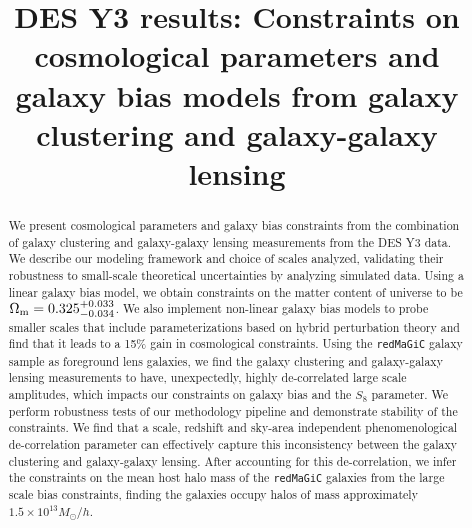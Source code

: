 \documentclass[aps, prd,twocolumn,superscriptaddress,nofootinbib,preprintnumbers]{revtex4-1}
\newcommand{\redmagic}{\texttt{redMaGiC} }
\begin{document}
\title[Short title, max. 45 characters]{DES Y3 results: Constraints on cosmological parameters and galaxy bias models from galaxy clustering and galaxy-galaxy lensing}


\label{firstpage}


\begin{abstract}
We present cosmological parameters and galaxy bias constraints from the combination of galaxy clustering and galaxy-galaxy lensing measurements from the DES Y3 data. We describe our modeling framework and choice of scales analyzed, validating their robustness to small-scale theoretical uncertainties by analyzing simulated data. Using a linear galaxy bias model, we obtain constraints on the matter content of universe to be $\Omega_{\rm m} = 0.325^{+0.033}_{-0.034}$. We also implement non-linear galaxy bias models to probe smaller scales that include parameterizations based on hybrid perturbation theory and find that it leads to a 15\% gain in cosmological constraints. Using the \redmagic galaxy sample as foreground lens galaxies, we find the galaxy clustering and galaxy-galaxy lensing measurements to have, unexpectedly, highly de-correlated large scale amplitudes, which impacts our constraints on galaxy bias and the $S_8$ parameter. We perform robustness tests of our methodology pipeline and demonstrate stability of the constraints. We find that a scale, redshift and sky-area independent phenomenological de-correlation parameter can effectively capture this inconsistency between the galaxy clustering and galaxy-galaxy lensing. After accounting for this de-correlation, we infer the constraints on the mean host halo mass of the \redmagic galaxies from the large scale bias constraints, finding the galaxies occupy halos of mass approximately $1.5 \times 10^{13} M_{\odot}/h$. 
\end{abstract}






\maketitle
\end{document}
